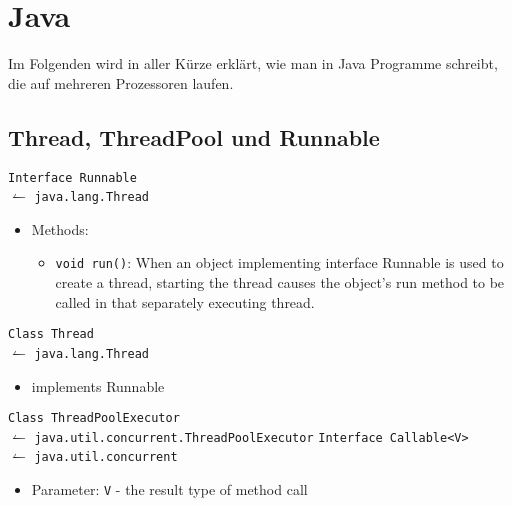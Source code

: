\chapter{Java}

Im Folgenden wird in aller Kürze erklärt, wie man in Java Programme schreibt,
die auf mehreren Prozessoren laufen.

\section{Thread, ThreadPool und Runnable}
\texttt{Interface Runnable}\\
\-\hspace{0.8cm}$\leftharpoonup$ \texttt{java.lang.Thread}%
\begin{itemize}
    \item Methods: 
    \begin{itemize}
        \item \texttt{void run()}: When an object implementing interface 
          Runnable is used to create a thread, starting the thread causes the 
          object's run method to be called in that separately executing thread.
    \end{itemize}
\end{itemize}
\texttt{Class Thread}\\
\-\hspace{0.8cm}$\leftharpoonup$ \texttt{java.lang.Thread}%
\begin{itemize}
    \item implements Runnable
\end{itemize}
\texttt{Class ThreadPoolExecutor}\\
\-\hspace{0.8cm}$\leftharpoonup$ \texttt{java.util.concurrent.ThreadPoolExecutor}
\texttt{Interface Callable<V>}\\
\-\hspace{0.8cm}$\leftharpoonup$ \texttt{java.util.concurrent}
\begin{itemize}
    \item Parameter: \texttt{V} - the result type of method call
 \end{itemize} 
